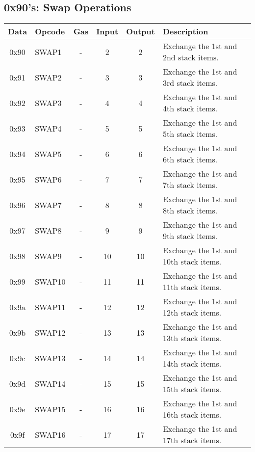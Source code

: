 \documentclass[10pt,a4paper,leqno,bibliography=totoc]{scrartcl}
\newenvironment{alphafootnotes}
{\par\edef\savedfootnotenumber{\number\value{footnote}}
\renewcommand{\thefootnote}{\alph{footnote}}
\setcounter{footnote}{0}}
{\par\setcounter{footnote}{\savedfootnotenumber}}
\begin{document}
\begin{alphafootnotes}
		\subsection{0x90's: Swap Operations}
			\begin{longtable}{|cP{2.8cm}cccp{6cm}|}
		        \hline  
		        \textbf{Data} & \textbf{Opcode} & \textbf{Gas}  & \textbf{Input}  & \textbf{Output} & \textbf{Description} \\
		        \hline  
			0x90 & SWAP1 & - & 2 & 2 & Exchange the 1st and 2nd stack items. \\
			0x91 & SWAP2 & - & 3 & 3 & Exchange the 1st and 3rd stack items. \\
			0x92 & SWAP3 & - & 4 & 4 & Exchange the 1st and 4th stack items. \\
			0x93 & SWAP4 & - & 5 & 5 & Exchange the 1st and 5th stack items. \\
			0x94 & SWAP5 & - & 6 & 6 & Exchange the 1st and 6th stack items. \\
			0x95 & SWAP6 & - & 7 & 7 & Exchange the 1st and 7th stack items. \\
			0x96 & SWAP7 & - & 8 & 8 & Exchange the 1st and 8th stack items. \\
			0x97 & SWAP8 & - & 9 & 9 & Exchange the 1st and 9th stack items. \\
			0x98 & SWAP9 & - & 10 & 10 & Exchange the 1st and 10th stack items. \\
			0x99 & SWAP10 & - & 11 & 11 & Exchange the 1st and 11th stack items. \\
			0x9a & SWAP11 & - & 12 & 12 & Exchange the 1st and 12th stack items. \\
			0x9b & SWAP12 & - & 13 & 13 & Exchange the 1st and 13th stack items. \\
			0x9c & SWAP13 & - & 14 & 14 & Exchange the 1st and 14th stack items. \\
			0x9d & SWAP14 & - & 15 & 15 & Exchange the 1st and 15th stack items. \\
			0x9e & SWAP15 & - & 16 & 16 & Exchange the 1st and 16th stack items. \\
			0x9f & SWAP16 & - & 17 & 17 & Exchange the 1st and 17th stack items. \\	
			\hline
			\end{longtable}


\end{alphafootnotes}
\end{document}
